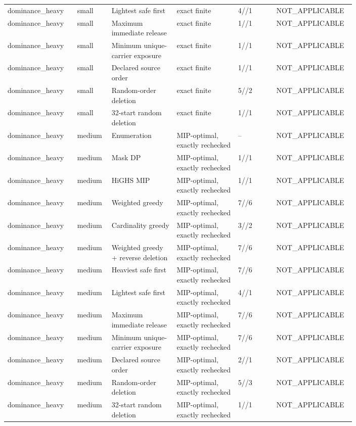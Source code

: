{\begin{longtable}{p{0.18\linewidth}p{0.07\linewidth}p{0.17\linewidth}p{0.16\linewidth}p{0.10\linewidth}p{0.12\linewidth}}
dominance\_heavy & small & Lightest safe first & exact finite & 4//1 & NOT\_APPLICABLE \\
dominance\_heavy & small & Maximum immediate release & exact finite & 1//1 & NOT\_APPLICABLE \\
dominance\_heavy & small & Minimum unique-carrier exposure & exact finite & 1//1 & NOT\_APPLICABLE \\
dominance\_heavy & small & Declared source order & exact finite & 1//1 & NOT\_APPLICABLE \\
dominance\_heavy & small & Random-order deletion & exact finite & 5//2 & NOT\_APPLICABLE \\
dominance\_heavy & small & 32-start random deletion & exact finite & 1//1 & NOT\_APPLICABLE \\
dominance\_heavy & medium & Enumeration & MIP-optimal, exactly rechecked & -- & NOT\_APPLICABLE \\
dominance\_heavy & medium & Mask DP & MIP-optimal, exactly rechecked & 1//1 & NOT\_APPLICABLE \\
dominance\_heavy & medium & HiGHS MIP & MIP-optimal, exactly rechecked & 1//1 & NOT\_APPLICABLE \\
dominance\_heavy & medium & Weighted greedy & MIP-optimal, exactly rechecked & 7//6 & NOT\_APPLICABLE \\
dominance\_heavy & medium & Cardinality greedy & MIP-optimal, exactly rechecked & 3//2 & NOT\_APPLICABLE \\
dominance\_heavy & medium & Weighted greedy + reverse deletion & MIP-optimal, exactly rechecked & 7//6 & NOT\_APPLICABLE \\
dominance\_heavy & medium & Heaviest safe first & MIP-optimal, exactly rechecked & 7//6 & NOT\_APPLICABLE \\
dominance\_heavy & medium & Lightest safe first & MIP-optimal, exactly rechecked & 4//1 & NOT\_APPLICABLE \\
dominance\_heavy & medium & Maximum immediate release & MIP-optimal, exactly rechecked & 7//6 & NOT\_APPLICABLE \\
dominance\_heavy & medium & Minimum unique-carrier exposure & MIP-optimal, exactly rechecked & 7//6 & NOT\_APPLICABLE \\
dominance\_heavy & medium & Declared source order & MIP-optimal, exactly rechecked & 2//1 & NOT\_APPLICABLE \\
dominance\_heavy & medium & Random-order deletion & MIP-optimal, exactly rechecked & 5//3 & NOT\_APPLICABLE \\
dominance\_heavy & medium & 32-start random deletion & MIP-optimal, exactly rechecked & 1//1 & NOT\_APPLICABLE \\

\end{longtable}}
